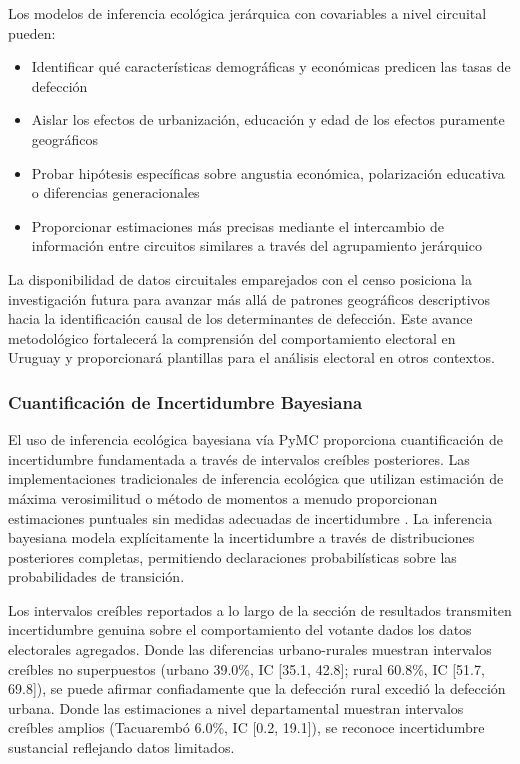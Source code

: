 Los modelos de inferencia ecológica jerárquica con covariables a nivel circuital pueden:

\begin{itemize}
    \item Identificar qué características demográficas y económicas predicen las tasas de defección
    \item Aislar los efectos de urbanización, educación y edad de los efectos puramente geográficos
    \item Probar hipótesis específicas sobre angustia económica, polarización educativa o diferencias generacionales
    \item Proporcionar estimaciones más precisas mediante el intercambio de información entre circuitos similares a través del agrupamiento jerárquico
\end{itemize}

La disponibilidad de datos circuitales emparejados con el censo posiciona la investigación futura para avanzar más allá de patrones geográficos descriptivos hacia la identificación causal de los determinantes de defección. Este avance metodológico fortalecerá la comprensión del comportamiento electoral en Uruguay y proporcionará plantillas para el análisis electoral en otros contextos.

\subsubsection{Cuantificación de Incertidumbre Bayesiana}

El uso de inferencia ecológica bayesiana vía PyMC proporciona cuantificación de incertidumbre fundamentada a través de intervalos creíbles posteriores. Las implementaciones tradicionales de inferencia ecológica que utilizan estimación de máxima verosimilitud o método de momentos a menudo proporcionan estimaciones puntuales sin medidas adecuadas de incertidumbre \citep{rosen2001bayesian}. La inferencia bayesiana modela explícitamente la incertidumbre a través de distribuciones posteriores completas, permitiendo declaraciones probabilísticas sobre las probabilidades de transición.

Los intervalos creíbles reportados a lo largo de la sección de resultados transmiten incertidumbre genuina sobre el comportamiento del votante dados los datos electorales agregados. Donde las diferencias urbano-rurales muestran intervalos creíbles no superpuestos (urbano 39.0\%, IC [35.1, 42.8]; rural 60.8\%, IC [51.7, 69.8]), se puede afirmar confiadamente que la defección rural excedió la defección urbana. Donde las estimaciones a nivel departamental muestran intervalos creíbles amplios (Tacuarembó 6.0\%, IC [0.2, 19.1]), se reconoce incertidumbre sustancial reflejando datos limitados.

